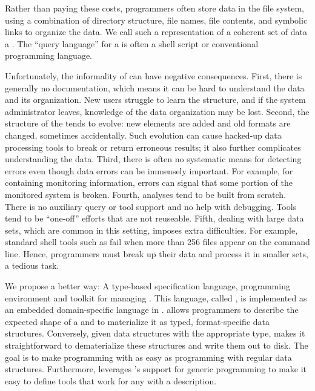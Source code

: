 Rather than paying these costs, programmers often store data in
the file system, using a combination of directory structure, file
names, file contents, and symbolic links to organize the data.  We call such a
representation of a coherent set of data a \textit{\filestore{}}.
The ``query language'' for a \filestore{}
is often a shell script or conventional programming language.

Unfortunately, the informality of \filestores{} can have
negative consequences.  First, there is generally no documentation,
which means it can be hard to understand the data and its
organization.  New users struggle to learn the structure, and if
the system administrator leaves, knowledge of the data
organization may be lost.  Second, the structure of the \filestore{} tends
to evolve: new elements are added and old formats are changed, sometimes
accidentally.  Such evolution can cause hacked-up data processing
tools to break or return erroneous results; it also further complicates
understanding the data.  Third, there is often no
systematic means for detecting errors even though data errors can
be immensely
important.  For example, for \filestores{} containing monitoring information,
errors can signal that some portion of the monitored system is broken.
Fourth, analyses tend to be built from scratch.
There is no auxiliary query or tool support and no help with debugging.
Tools tend to be ``one-off'' efforts that are not
reuseable.  Fifth, dealing with
large data sets, which are common in this setting, imposes extra
difficulties.  For example,  standard shell tools
such as  fail when more than 256 files appear on the
command line.  Hence, programmers must  break up their data
and process it in smaller sets, a tedious task.

We propose a better way: A type-based
specification language, programming environment and toolkit for
managing \filestores{}.  
This language, called \forest{}, is implemented as an embedded domain-specific
language in \haskell{}.
\forest{} allows programmers to describe the expected shape of a
\filestore{} and to materialize it as typed,
format-specific \haskell{} data structures.  Conversely,
given data structures with the appropriate type, \forest{}
makes it straightforward to dematerialize these structures
and write them out to disk.  The
goal is to make programming with \filestores{} as
easy as programming with regular \haskell{} data
structures.  Furthermore, \forest{} leverages
\haskell{}'s support for generic programming to make it easy to define
tools that work for any \filestore{} with a \forest{} description.  


